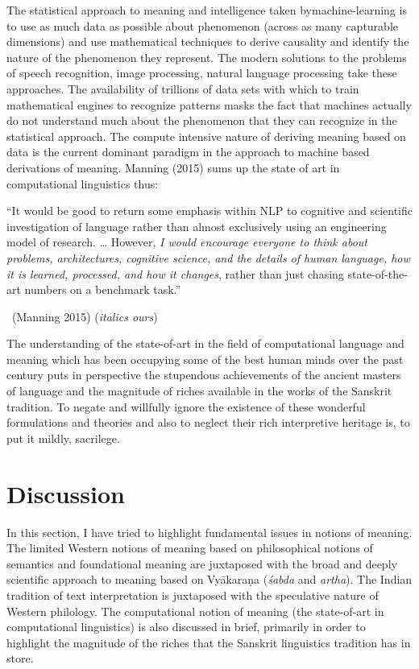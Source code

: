 The statistical approach to meaning and intelligence taken by\break machine-learning is to use as much data as possible about phenomenon (across as many capturable dimensions) and use mathematical techniques to derive causality and identify the nature of the phenomenon they represent. The modern solutions to the problems of speech recognition, image processing, natural language processing take these approaches. The availability of trillions of data sets with which to train mathematical engines to recognize patterns masks the fact that machines actually do not understand much about the phenomenon that they can recognize in the statistical approach. The compute intensive nature of deriving meaning based on data is the current dominant paradigm in the approach to machine based derivations of meaning. Manning (2015) sums up the state of art in computational linguistics thus:

\begin{myquote}
“It would be good to return some emphasis within NLP to cognitive and scientific investigation of language rather than almost exclusively using an engineering model of research. … However, \textit{I would encourage everyone to think about problems, architectures, cognitive science, and the details of human language, how it is learned, processed, and how it changes}, rather than just chasing state-of-the-art numbers on a benchmark task.”

~\hfill (Manning 2015) (\textit{italics ours})
\end{myquote}

The understanding of the state-of-art in the field of computational language and meaning which has been occupying some of the best human minds over the past century puts in perspective the stupendous achievements of the ancient masters of language and the magnitude of riches available in the works of the Sanskrit tradition. To negate and willfully ignore the existence of these wonderful formulations and theories and also to neglect their rich interpretive heritage is, to put it mildly, sacrilege.


\section*{Discussion}

In this section, I have tried to highlight fundamental issues in notions of meaning. The limited Western notions of meaning based on philosophical notions of semantics and foundational meaning are juxtaposed with the broad and deeply scientific approach to meaning based on Vyākaraṇa (\textit{śabda} and \textit{artha}). The Indian tradition of text interpretation is juxtaposed with the speculative nature of Western philology. The computational notion of meaning (the state-of-art in computational linguistics) is also discussed in brief, primarily in order to highlight the magnitude of the riches that the Sanskrit linguistics tradition has in store.

